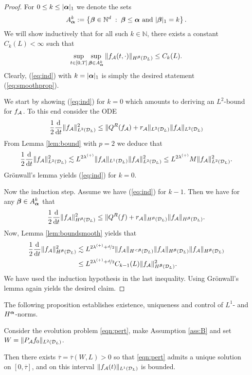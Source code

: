 \begin{proof}
    For $0\le k \le |{\bm\alpha}|_1$ we denote the sets
    $$
        A_{\bm\alpha}^k:=\left\{{\bm\beta} \in \mathbb{N}^d \;:\;
        {\bm\beta} \le {\bm\alpha} \mbox{  and  }|{\bm\beta}|_1 = k\right\}.
    $$
    We will show inductively that for all such $k\in \mathbb{N}$, there exists a
    constant $C_k(L)<\infty$ such that
    \begin{equation}\label{eq:ind}
        \sup_{t\in [0,T]}\sup_{{\bm\beta} \in A_{\bm\alpha}^k}
        \|f_{\mathcal{A}}(t,\cdot)\|_{H^{\bm\beta}(\mathcal{D}_L)}\le C_k(L).
    \end{equation}
    Clearly, (\ref{eq:ind}) with $k=|{\bm\alpha}|_1$ is simply the desired
    statement (\ref{eq:smoothprop}).
    
    We start by showing (\ref{eq:ind}) for $k= 0$ which amounts to deriving an
    $L^2$-bound for $f_{\mathcal{A}}$. To this end consider the ODE
    $$
        \frac12\frac{\mathrm{d}}{\mathrm{d} t}\|f_{\mathcal{A}}\|_{L^2(\mathcal{D}_L)}^2 \le 
        \|Q^R(f_{\mathcal{A}})+r_{\mathcal{A}}\|_{L^2(\mathcal{D}_L)} \|f_{\mathcal{A}}\|_{L^2(\mathcal{D}_L)}
    $$
    From Lemma \ref{lem:bound} with $p=2$ we deduce that
    $$
        \frac12\frac{\mathrm{d}}{\mathrm{d} t}\|f_{\mathcal{A}}\|_{L^2(\mathcal{D}_L)}^2 \lesssim
        L^{2\lambda^{(+)}} \|f_{\mathcal{A}}\|_{L^1(\mathcal{D}_L)} \|f_{\mathcal{A}}\|_{L^2(\mathcal{D}_L)}^2 \le 
        L^{2\lambda^{(+)}} M\|f_{\mathcal{A}}\|_{L^2(\mathcal{D}_L)}^2.
    $$
    Grönwall's lemma yields (\ref{eq:ind}) for $k=0$.
    
    Now the induction step. Assume we have (\ref{eq:ind}) for $k-1$.  Then we
    have for any ${\bm\beta} \in A_{\bm\alpha}^k$ that
    $$
        \frac12\frac{\mathrm{d}}{\mathrm{d} t}\|f_{\mathcal{A}}\|_{H^{\bm\beta}(\mathcal{D}_L)}^2 \le 
        \|Q^R(f)+r_{\mathcal{A}}\|_{H^{\bm\beta}(\mathcal{D}_L)} \|f_{\mathcal{A}}\|_{H^{\bm\beta}(\mathcal{D}_L)}.
    $$
    Now, Lemma \ref{lem:boundsmooth} yields that
    \begin{align*}
        \frac12\frac{\mathrm{d}}{\mathrm{d} t}\|f_{\mathcal{A}}\|_{H^{\bm\beta}(\mathcal{D}_L)}^2 & \lesssim
        L^{2\lambda^{(+)}+\nicefrac{d}{2}} \|f_{\mathcal{A}}\|_{H^{<{\bm\beta}}(\mathcal{D}_L)}
        \|f_{\mathcal{A}}\|_{H^{\bm\beta}(\mathcal{D}_L)}\|f_{\mathcal{A}}\|_{H^{\bm\beta}(\mathcal{D}_L)} \\ 
        & \le L^{2\lambda^{(+)}+\nicefrac{d}{2}}C_{k-1}(L)\|f_{\mathcal{A}}\|_{H^{\bm\beta}(\mathcal{D}_L)}^2.
    \end{align*}
    We have used the induction hypothesis in the last inequality.  Using
    Grönwall's lemma again yields the desired claim.
\end{proof}
The following proposition establishes existence, uniqueness and control of
$L^1$- and $H^{\bm\alpha}$-norms.
\begin{proposition}\label{lem:existence}
  Consider the evolution problem \eqref{eqn:pert}, make Assumption
  \ref{ass:B} and set $W=\|P_{\mathcal{A}} f_0\|_{L^2(\mathcal{D}_L)}$.

    Then there exists $\overline{\tau} = \overline{\tau}(W,L) > 0$ so that
    \eqref{eqn:pert} admits a unique solution on $[0,\overline{\tau}]$, and on
    this interval $\|f_{\mathcal{A}}(t)\|_{L^1(\mathcal{D}_L)}$ is bounded.
\end{proposition}
